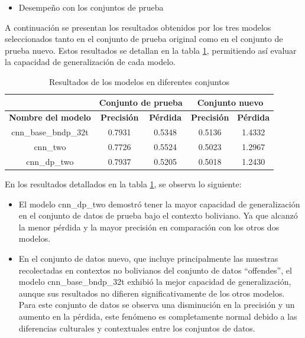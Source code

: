 \begin{itemize}
\item Desempeño con los conjuntos de prueba
\end{itemize}

A continuación se presentan los resultados obtenidos por los tres modelos seleccionados tanto en el conjunto de prueba original como en el conjunto de prueba nuevo. Estos resultados se detallan en la tabla \ref{tbl:resultados}, permitiendo así evaluar la capacidad de generalización de cada modelo.


\begin{table}[!ht]
	\centering
	\begin{tabular}{|c|c|c|c|c|}
		\hline
		~ & \multicolumn{2}{|c|}{\textbf{Conjunto de prueba}} & \multicolumn{2}{|c|}{\textbf{Conjunto nuevo}} \\ \hline
		\textbf{Nombre del modelo} & \textbf{Precisión} & \textbf{Pérdida} & \textbf{Precisión} & \textbf{Pérdida} \\ \hline
		cnn\_base\_bndp\_32t & 0.7931 & 0.5348 & 0.5136 & 1.4332 \\ \hline
		cnn\_two & 0.7726 & 0.5524 & 0.5023 & 1.2967 \\ \hline
		cnn\_dp\_two & 0.7937 & 0.5205 & 0.5018 & 1.2430 \\ \hline
	\end{tabular}
	\caption{Resultados de los modelos en diferentes conjuntos}
	\label{tbl:resultados}
\end{table}


En los resultados detallados en la tabla \ref{tbl:resultados}, se observa lo siguiente:

\begin{itemize}

\item El modelo cnn\_dp\_two demostró tener la mayor capacidad de generalización en el conjunto de datos de prueba bajo el contexto boliviano. Ya que alcanzó la menor pérdida y la mayor precisión en comparación con los otros dos modelos.

\item En el conjunto de datos nuevo, que incluye principalmente las muestras recolectadas en contextos no bolivianos del conjunto de datos “offendes”, el modelo cnn\_base\_bndp\_32t exhibió la mejor capacidad de generalización, aunque sus resultados no difieren significativamente de los otros modelos. Para este conjunto de datos se observa una disminución en la precisión y un aumento en la pérdida, este fenómeno es completamente normal debido a las diferencias culturales y contextuales entre los conjuntos de datos.

\end{itemize}

